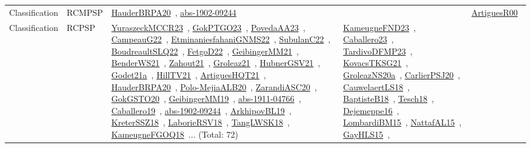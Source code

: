{\begin{longtable}{lp{3cm}>{\raggedright\arraybackslash}p{6cm}>{\raggedright\arraybackslash}p{6cm}>{\raggedright\arraybackslash}p{8cm}}
Classification & RCMPSP & \href{../works/HauderBRPA20.pdf}{HauderBRPA20}~\cite{HauderBRPA20}, \href{../works/abs-1902-09244.pdf}{abs-1902-09244}~\cite{abs-1902-09244} &  & \href{../works/ArtiguesR00.pdf}{ArtiguesR00}~\cite{ArtiguesR00}\\
Classification & RCPSP & \href{../works/YuraszeckMCCR23.pdf}{YuraszeckMCCR23}~\cite{YuraszeckMCCR23}, \href{../works/GokPTGO23.pdf}{GokPTGO23}~\cite{GokPTGO23}, \href{../works/PovedaAA23.pdf}{PovedaAA23}~\cite{PovedaAA23}, \href{../works/CampeauG22.pdf}{CampeauG22}~\cite{CampeauG22}, \href{../works/EtminaniesfahaniGNMS22.pdf}{EtminaniesfahaniGNMS22}~\cite{EtminaniesfahaniGNMS22}, \href{../works/SubulanC22.pdf}{SubulanC22}~\cite{SubulanC22}, \href{../works/BoudreaultSLQ22.pdf}{BoudreaultSLQ22}~\cite{BoudreaultSLQ22}, \href{../works/FetgoD22.pdf}{FetgoD22}~\cite{FetgoD22}, \href{../works/GeibingerMM21.pdf}{GeibingerMM21}~\cite{GeibingerMM21}, \href{../works/BenderWS21.pdf}{BenderWS21}~\cite{BenderWS21}, \href{../works/Zahout21.pdf}{Zahout21}~\cite{Zahout21}, \href{../works/Groleaz21.pdf}{Groleaz21}~\cite{Groleaz21}, \href{../works/HubnerGSV21.pdf}{HubnerGSV21}~\cite{HubnerGSV21}, \href{../works/Godet21a.pdf}{Godet21a}~\cite{Godet21a}, \href{../works/HillTV21.pdf}{HillTV21}~\cite{HillTV21}, \href{../works/ArtiguesHQT21.pdf}{ArtiguesHQT21}~\cite{ArtiguesHQT21}, \href{../works/HauderBRPA20.pdf}{HauderBRPA20}~\cite{HauderBRPA20}, \href{../works/Polo-MejiaALB20.pdf}{Polo-MejiaALB20}~\cite{Polo-MejiaALB20}, \href{../works/ZarandiASC20.pdf}{ZarandiASC20}~\cite{ZarandiASC20}, \href{../works/GokGSTO20.pdf}{GokGSTO20}~\cite{GokGSTO20}, \href{../works/GeibingerMM19.pdf}{GeibingerMM19}~\cite{GeibingerMM19}, \href{../works/abs-1911-04766.pdf}{abs-1911-04766}~\cite{abs-1911-04766}, \href{../works/Caballero19.pdf}{Caballero19}~\cite{Caballero19}, \href{../works/abs-1902-09244.pdf}{abs-1902-09244}~\cite{abs-1902-09244}, \href{../works/ArkhipovBL19.pdf}{ArkhipovBL19}~\cite{ArkhipovBL19}, \href{../works/KreterSSZ18.pdf}{KreterSSZ18}~\cite{KreterSSZ18}, \href{../works/LaborieRSV18.pdf}{LaborieRSV18}~\cite{LaborieRSV18}, \href{../works/TangLWSK18.pdf}{TangLWSK18}~\cite{TangLWSK18}, \href{../works/KameugneFGOQ18.pdf}{KameugneFGOQ18}~\cite{KameugneFGOQ18}... (Total: 72) & \href{../works/KameugneFND23.pdf}{KameugneFND23}~\cite{KameugneFND23}, \href{../works/Caballero23.pdf}{Caballero23}~\cite{Caballero23}, \href{../works/TardivoDFMP23.pdf}{TardivoDFMP23}~\cite{TardivoDFMP23}, \href{../works/KovacsTKSG21.pdf}{KovacsTKSG21}~\cite{KovacsTKSG21}, \href{../works/GroleazNS20a.pdf}{GroleazNS20a}~\cite{GroleazNS20a}, \href{../works/CarlierPSJ20.pdf}{CarlierPSJ20}~\cite{CarlierPSJ20}, \href{../works/CauwelaertLS18.pdf}{CauwelaertLS18}~\cite{CauwelaertLS18}, \href{../works/BaptisteB18.pdf}{BaptisteB18}~\cite{BaptisteB18}, \href{../works/Tesch18.pdf}{Tesch18}~\cite{Tesch18}, \href{../works/Dejemeppe16.pdf}{Dejemeppe16}~\cite{Dejemeppe16}, \href{../works/LombardiBM15.pdf}{LombardiBM15}~\cite{LombardiBM15}, \href{../works/NattafAL15.pdf}{NattafAL15}~\cite{NattafAL15}, \href{../works/GayHLS15.pdf}{GayHLS15}~\cite{GayHLS15}, 
\end{longtable}}
